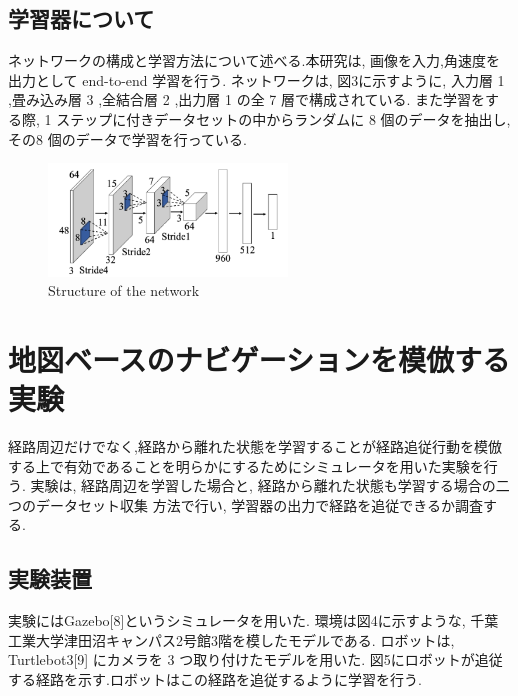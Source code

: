 \documentclass{jarticle}
\begin{document}
\subsection{学習器について}
ネットワークの構成と学習方法について述べる.本研究は,
画像を入力,角速度を出力として end-to-end 学習を行う.
ネットワークは, 図3に示すように, 入力層 1 ,畳み込み層 3 ,全結合層 2 ,出力層 1 の全 7 層で構成されている.
また学習をする際, 1 ステップに付きデータセットの中からランダムに 8 個のデータを抽出し, 
その8 個のデータで学習を行っている.


\begin{figure}[h!]
  \centering
   \includegraphics[height=30mm]{./figs/gaku2.png}
   \caption{Structure of the network}
\end{figure}


\section{地図ベースのナビゲーションを模倣する実験}

経路周辺だけでなく,経路から離れた状態を学習することが経路追従行動を模倣
する上で有効であることを明らかにするためにシミュレータを用いた実験を行う. 
実験は, 経路周辺を学習した場合と, 経路から離れた状態も学習する場合の二つのデータセット収集
方法で行い, 学習器の出力で経路を追従できるか調査する.

\subsection{実験装置}
実験にはGazebo[8]というシミュレータを用いた.
環境は図4に示すような, 千葉工業大学津田沼キャンパス2号館3階を模したモデルである.
ロボットは,  Turtlebot3[9] にカメラを 3 つ取り付けたモデルを用いた. 
図5にロボットが追従する経路を示す.ロボットはこの経路を追従するように学習を行う.
\end{document}

